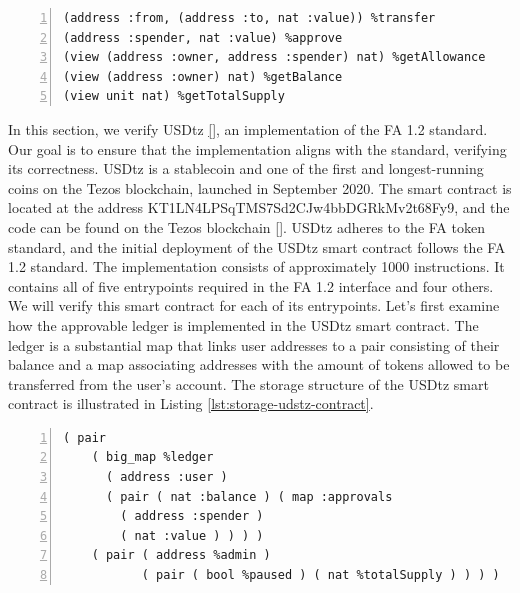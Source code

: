 \documentclass[a4paper,UKenglish,cleveref, autoref, thm-restate]{lipics-v2021}
\begin{document}
\begin{lstlisting}[float,captionpos=b,caption={FA 1.2 interface},label={lst:fa12-interface},numbers=left]
(address :from, (address :to, nat :value)) %transfer
(address :spender, nat :value) %approve
(view (address :owner, address :spender) nat) %getAllowance
(view (address :owner) nat) %getBalance
(view unit nat) %getTotalSupply
\end{lstlisting}

In this section, we verify USDtz \ref{}, an implementation of the FA 1.2 standard. Our goal is to ensure that the implementation aligns with the standard, verifying its correctness. USDtz is a stablecoin and one of the first and longest-running coins on the Tezos blockchain, launched in September 2020. The smart contract is located at the address KT1LN4LPSqTMS7Sd2CJw4bbDGRkMv2t68Fy9, and the code can be found on the Tezos blockchain \ref{}. USDtz adheres to the FA token standard, and the initial deployment of the USDtz smart contract follows the FA 1.2 standard.
The implementation consists of approximately 1000 instructions. It contains all of five entrypoints required in the FA 1.2 interface and four others.  We will verify this smart contract for each of its entrypoints.  Let's first examine how the approvable ledger is implemented in the USDtz smart contract. The ledger is a substantial map that links user addresses to a pair consisting of their balance and a map associating addresses with the amount of tokens allowed to be transferred from the user's account. The storage structure of the USDtz smart contract is illustrated in Listing \ref{lst:storage-udstz-contract}. 

\begin{lstlisting}[float,captionpos=b,caption={Storage of the USDtz smart contract},label={lst:storage-udstz-contract},numbers=left]
  ( pair
    ( big_map %ledger
      ( address :user )
      ( pair ( nat :balance ) ( map :approvals
        ( address :spender )
        ( nat :value ) ) ) )
    ( pair ( address %admin ) 
           ( pair ( bool %paused ) ( nat %totalSupply ) ) ) ) 
\end{lstlisting}
\end{document}
